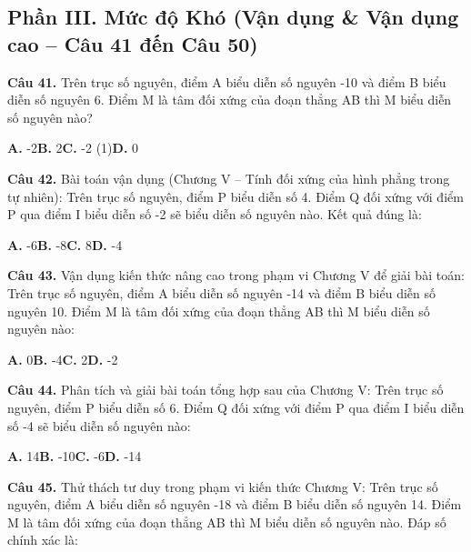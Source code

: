 \documentclass[11pt,a4paper]{article}
\begin{document}
\subsection*{\color{accent} Phần III. Mức độ Khó (Vận dụng \& Vận dụng cao -- Câu 41 đến Câu 50)}
\textbf{\color{primary} Câu 41.} Trên trục số nguyên, điểm A biểu diễn số nguyên -10 và điểm B biểu diễn số nguyên 6. Điểm M là tâm đối xứng của đoạn thẳng AB thì M biểu diễn số nguyên nào?\par
\hspace*{1.5em}\textbf{A.} -2\quad\quad \textbf{B.} 2\quad\quad \textbf{C.} -2 (1)\quad\quad \textbf{D.} 0\par\vspace{2pt}
\textbf{\color{primary} Câu 42.} Bài toán vận dụng (Chương V – Tính đối xứng của hình phẳng trong tự nhiên): Trên trục số nguyên, điểm P biểu diễn số 4. Điểm Q đối xứng với điểm P qua điểm I biểu diễn số -2 sẽ biểu diễn số nguyên nào. Kết quả đúng là:\par
\hspace*{1.5em}\textbf{A.} -6\quad\quad \textbf{B.} -8\quad\quad \textbf{C.} 8\quad\quad \textbf{D.} -4\par\vspace{2pt}
\textbf{\color{primary} Câu 43.} Vận dụng kiến thức nâng cao trong phạm vi Chương V để giải bài toán: Trên trục số nguyên, điểm A biểu diễn số nguyên -14 và điểm B biểu diễn số nguyên 10. Điểm M là tâm đối xứng của đoạn thẳng AB thì M biểu diễn số nguyên nào:\par
\hspace*{1.5em}\textbf{A.} 0\quad\quad \textbf{B.} -4\quad\quad \textbf{C.} 2\quad\quad \textbf{D.} -2\par\vspace{2pt}
\textbf{\color{primary} Câu 44.} Phân tích và giải bài toán tổng hợp sau của Chương V: Trên trục số nguyên, điểm P biểu diễn số 6. Điểm Q đối xứng với điểm P qua điểm I biểu diễn số -4 sẽ biểu diễn số nguyên nào:\par
\hspace*{1.5em}\textbf{A.} 14\quad\quad \textbf{B.} -10\quad\quad \textbf{C.} -6\quad\quad \textbf{D.} -14\par\vspace{2pt}
\textbf{\color{primary} Câu 45.} Thử thách tư duy trong phạm vi kiến thức Chương V: Trên trục số nguyên, điểm A biểu diễn số nguyên -18 và điểm B biểu diễn số nguyên 14. Điểm M là tâm đối xứng của đoạn thẳng AB thì M biểu diễn số nguyên nào. Đáp số chính xác là:\par
\end{document}
